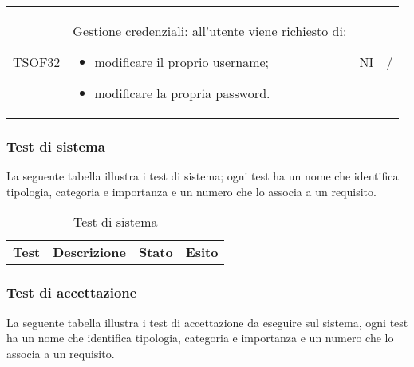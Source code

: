 \begin{center}
\begin{longtable}[!h]{p{60px} p{240px} p{35px} p{35px}}
        TSOF32                           & Gestione credenziali: all'utente viene richiesto di: \begin{itemize} \item modificare il proprio username; \item modificare la propria password.\end{itemize}                                                                                     & NI             & /             \\
    \end{longtable}
\end{center}
\pagebreak
\subsubsection{Test di sistema}
La seguente tabella illustra i test di sistema; ogni test ha un nome che identifica tipologia, categoria e importanza e un numero che lo associa a un requisito.
\begin{center}
    \centering
    \renewcommand{\arraystretch}{1.8}
    \label{tab:TestSistema}
    \begin{longtable}[!h]{p{60px} p{240px} p{35px} p{35px}}
        \caption{Test di sistema}                                                                                                                                                                                                           \\
        \rowcolor{logo!70} \textbf{Test} & \textbf{Descrizione}                                                                                                                                                & \textbf{Stato} & \textbf{Esito} \\
    
    \end{longtable}
\end{center}
\pagebreak
\subsubsection{Test di accettazione}
La seguente tabella illustra i test di accettazione da eseguire sul sistema, ogni test ha un nome che identifica tipologia, categoria e importanza e un numero che lo associa a un requisito.
